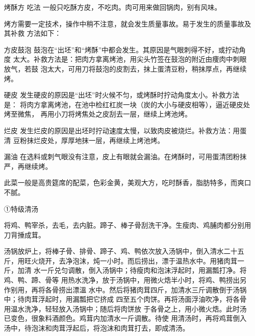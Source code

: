 \begin{recipe}{烤酥方}
\step 吃法 一般只吃酥方皮，不吃肉。肉可用来做回锅肉，别有风味。

\notice

烤方需要一定技术，操作中稍不注意，就会发生质量事故。易于发生的质量事故及其补救
方法如下：

\step 方皮鼓泡 鼓泡在“出坯”和“烤酥”中都会发生。其原因是气眼刺得不好，或拧动角度
太大。补救方法是：把肉方拿离烤池，用尖头竹签在鼓泡的附近由痩肉中刺眼放气，若鼓
泡太大，可用刀将鼓泡的皮割去，抹上蛋清豆粉，稍抹厚点，再继续烤。

\step 硬皮 发生硬皮的原因是“出坯”时火候不匀，或烤酥时拧动角度太小。补救方法是：
将肉方拿离烤池，在池中检红杠炭一块（炭的大小与硬皮相等），逼近硬皮处烤至微焦，
再用小刀将烤焦处之皮刮去一层，继续上烤池烤。

\step 烂皮 发生烂皮的原因是出坯时拧动速度太慢，以致肉皮被烧烂。补救方法：用蛋清
豆粉抹烂皮处，厚厚地抹一层，再继续上烤池烤。

\step 漏油 在选料或刺气眼没有注意，皮上有眼就会漏油。在烤酥时，可用蛋清团粉抹
严，再继续烤。

\notes

此菜一般是高贵筵席的配菜，色彩金黄，美观大方，吃时酥香，脂肪特多，而爽口不腻。

①特级清汤

\ingredients


\cooking

\step 将鸡、鸭宰杀，去毛，去内脏。蹄子、棒子骨刮洗干净。生瘦肉、鸡脯肉都分别用
刀背捶成茸。

\step 汤锅放炉上，将棒子骨、排骨、蹄子、鸡、鸭依次放入汤锅中，倒入清水二十五
斤，用旺火烧开，去净泡沫，炖一小时。而后捞出，漂于温热水中。用猪肉茸一斤，加清
水一斤兑匀调散，倒入汤锅中；待瘦肉和泡沫浮起时，用漏瓢打净。将鸡、鸭、蹄、骨等
用热水洗净，放于汤锅中，用微火焅半小时，将鸡、鸭捞出另作别用，再将各骨捞出漂溫
水中。然后将猪肉茸四斤，加清水三斤调散倒于汤锅中；待肉茸浮起时，用漏瓢把它挤成
四至五个肉饼。再将汤面浮油吹净，将各骨用温水洗净，轻轻放入汤锅中；随后将肉饼放
于各骨之上，用小微火焅。此时汤已变色，很象料酒颜色。鸡茸内加清水一斤调散。待使
用清汤时，再将鸡茸倒入汤中，待泡沫和肉茸浮起后，将泡沫和肉茸打去，即成清汤。

\end{recipe}

